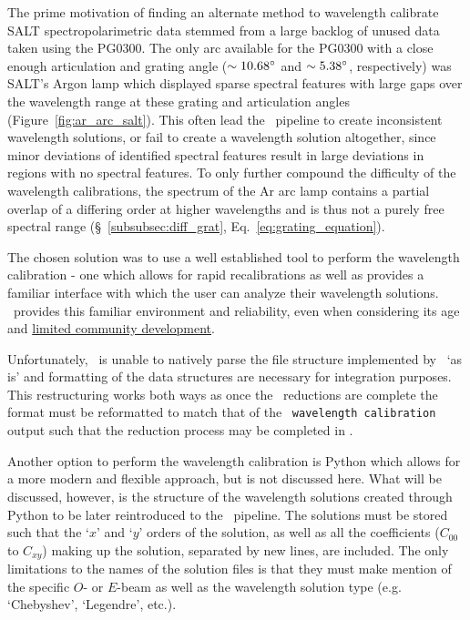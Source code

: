 The prime motivation of finding an alternate method to wavelength calibrate \gls{SALT} spectropolarimetric data stemmed from a large backlog of unused data taken using the PG$0300$. The only arc available for the PG$0300$ with a close enough articulation and grating angle ($\sim 10.68\hbox{$^\circ$}$ and $\sim 5.38\hbox{$^\circ$}$, respectively) was \gls{SALT}'s Argon lamp which displayed sparse spectral features with large gaps over the wavelength range at these grating and articulation angles (Figure~\ref{fig:ar_arc_salt}). This often lead the \polsalt\ pipeline to create inconsistent wavelength solutions, or fail to create a wavelength solution altogether, since minor deviations of identified spectral features result in large deviations in regions with no spectral features. To only further compound the difficulty of the wavelength calibrations, the spectrum of the Ar arc lamp contains a partial overlap of a differing order at higher wavelengths and is thus not a purely free spectral range (\S~\ref{subsubsec:diff_grat}, Eq.~\ref{eq:grating_equation}).

The chosen solution was to use a well established tool to perform the wavelength calibration - one which allows for rapid recalibrations as well as provides a familiar interface with which the user can analyze their wavelength solutions. \iraf\ provides this familiar environment and reliability, even when considering its age and \href{https://github.com/iraf-community/iraf}{limited community development}.

Unfortunately, \iraf\ is unable to natively parse the file structure implemented by \polsalt\ `as is' and formatting of the data structures are necessary for integration purposes. This restructuring works both ways as once the \iraf\ reductions are complete the format must be reformatted to match that of the \polsalt\ \texttt{wavelength calibration} output such that the reduction process may be completed in \polsalt.

Another option to perform the wavelength calibration is Python which allows for a more modern and flexible approach, but is not discussed here. What will be discussed, however, is the structure of the wavelength solutions created through Python to be later reintroduced to the \polsalt\ pipeline. The solutions must be stored such that the `$x$' and `$y$' orders of the solution, as well as all the coefficients ($C_{00}$ to $C_{xy}$) making up the solution, separated by new lines, are included. The only limitations to the names of the solution files is that they must make mention of the specific $O$- or $E$-beam as well as the wavelength solution type (e.g. `Chebyshev', `Legendre', etc.).

